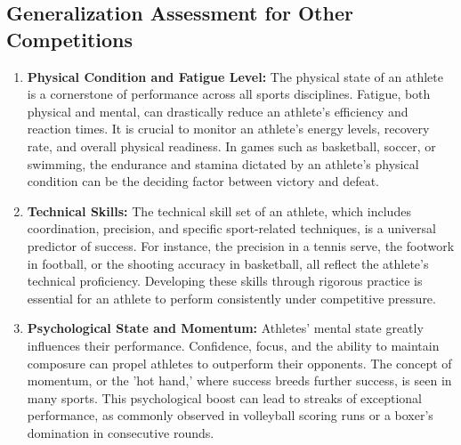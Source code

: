 \documentclass[12pt]{article}
\begin{document}
\subsection{Generalization Assessment for Other Competitions}
\begin{enumerate}
      \item \textbf{Physical Condition and Fatigue Level:} The physical state of an athlete is a cornerstone of performance across all sports disciplines. Fatigue, both physical and mental, can drastically reduce an athlete's efficiency and reaction times. It is crucial to monitor an athlete's energy levels, recovery rate, and overall physical readiness. In games such as basketball, soccer, or swimming, the endurance and stamina dictated by an athlete's physical condition can be the deciding factor between victory and defeat.
      \item \textbf{Technical Skills:} The technical skill set of an athlete, which includes coordination, precision, and specific sport-related techniques, is a universal predictor of success. For instance, the precision in a tennis serve, the footwork in football, or the shooting accuracy in basketball, all reflect the athlete's technical proficiency. Developing these skills through rigorous practice is essential for an athlete to perform consistently under competitive pressure.
      \item \textbf{Psychological State and Momentum:} Athletes' mental state greatly influences their performance. Confidence, focus, and the ability to maintain composure can propel athletes to outperform their opponents. The concept of momentum, or the 'hot hand,' where success breeds further success, is seen in many sports. This psychological boost can lead to streaks of exceptional performance, as commonly observed in volleyball scoring runs or a boxer's domination in consecutive rounds.
\end{enumerate}
\end{document}
